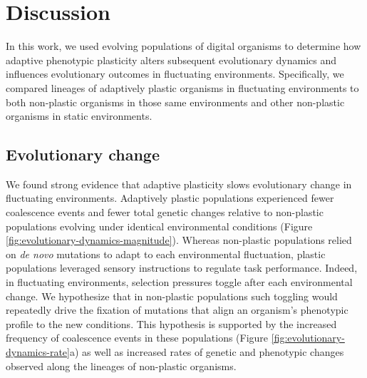 
\section{Discussion}

In this work, we used evolving populations of digital organisms to determine how adaptive phenotypic plasticity alters subsequent evolutionary dynamics and influences evolutionary outcomes in fluctuating environments.
Specifically, we compared lineages of adaptively plastic organisms in fluctuating environments to both non-plastic organisms in those same environments and other non-plastic organisms in static environments.

\subsection{Evolutionary change}

We found strong evidence that adaptive plasticity slows evolutionary change in fluctuating environments. 
Adaptively plastic populations experienced fewer coalescence events and fewer total genetic changes relative to non-plastic populations evolving under identical environmental conditions (Figure \ref{fig:evolutionary-dynamics-magnitude}).
Whereas non-plastic populations relied on \textit{de novo} mutations to adapt to each environmental fluctuation, plastic populations leveraged sensory instructions to regulate task performance. 
Indeed, in fluctuating environments, selection pressures toggle after each environmental change.
We hypothesize that in non-plastic populations such toggling would repeatedly drive the fixation of mutations that align an organism's phenotypic profile to the new conditions.
This hypothesis is supported by the increased frequency of coalescence events in these populations (Figure \ref{fig:evolutionary-dynamics-rate}a) as well as increased rates of genetic and phenotypic changes observed along the lineages of non-plastic organisms. 



